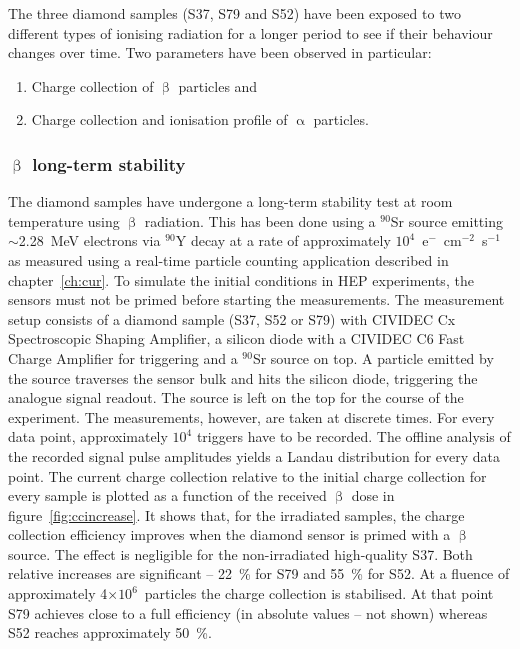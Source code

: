 The three diamond samples (S37, S79 and S52) have been exposed to two different types of ionising radiation for a longer period to see if their behaviour changes over time. Two parameters have been observed in particular: 
\begin{enumerate}
\item Charge collection of $\upbeta$ particles and 
\item Charge collection and ionisation profile of $\upalpha$ particles.
\end{enumerate}

\subsubsection{$\upbeta$ long-term stability}
The diamond samples have undergone a long-term stability test at room temperature using $\upbeta$ radiation. This has been done using a $^{90}$Sr source emitting $\sim$2.28~MeV electrons via $^{90}$Y decay at a rate of approximately $10^4$~e$^-$~cm$^{-2}$~s$^{-1}$ as measured using a real-time particle counting application described in chapter~\ref{ch:cur}. To simulate the initial conditions in HEP experiments, the sensors must not be primed before starting the measurements. The measurement setup consists of a diamond sample (S37, S52 or S79) with CIVIDEC Cx Spectroscopic Shaping Amplifier, a silicon diode with a CIVIDEC C6 Fast Charge Amplifier for triggering and a $^{90}$Sr source on top. A particle emitted by the source traverses the sensor bulk and hits the silicon diode, triggering the analogue signal readout. The source is left on the top for the course of the experiment. The measurements, however, are taken at discrete times. For every data point, approximately $10^4$ triggers have to be recorded. The offline analysis of the recorded signal pulse amplitudes yields a Landau distribution for every data point. The current charge collection relative to the initial charge collection for every sample is plotted as a function of the received $\upbeta$ dose in figure~\ref{fig:ccincrease}. It shows that, for the irradiated samples, the charge collection efficiency improves when the diamond sensor is primed with a $\upbeta$ source. The effect is negligible for the non-irradiated high-quality S37. Both relative increases are significant -- 22~\% for S79 and 55~\% for S52. At a fluence of approximately 4$\times10^6$~particles the charge collection is stabilised. At that point S79 achieves close to a full efficiency (in absolute values -- not shown) whereas S52 reaches approximately 50~\%.

